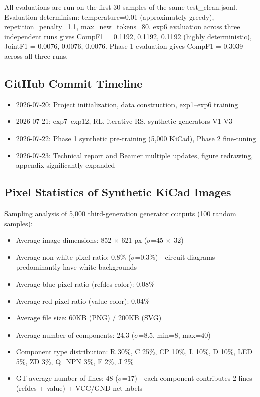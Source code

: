 All evaluations are run on the first 30 samples of the same test\_clean.jsonl. Evaluation determinism: temperature=0.01 (approximately greedy), repetition\_penalty=1.1, max\_new\_tokens=80. exp6 evaluation across three independent runs gives CompF1 = 0.1192, 0.1192, 0.1192 (highly deterministic), JointF1 = 0.0076, 0.0076, 0.0076. Phase 1 evaluation gives CompF1 = 0.3039 across all three runs.

\subsection{GitHub Commit Timeline}

\begin{itemize}[nosep]
    \item 2026-07-20: Project initialization, data construction, exp1--exp6 training
    \item 2026-07-21: exp7--exp12, RL, iterative RS, synthetic generators V1-V3
    \item 2026-07-22: Phase 1 synthetic pre-training (5,000 KiCad), Phase 2 fine-tuning
    \item 2026-07-23: Technical report and Beamer multiple updates, figure redrawing, appendix significantly expanded
\end{itemize}

\subsection{Pixel Statistics of Synthetic KiCad Images}

Sampling analysis of 5,000 third-generation generator outputs (100 random samples):

\begin{itemize}[nosep]
    \item Average image dimensions: 852 $\times$ 621 px ($\sigma$=45 $\times$ 32)
    \item Average non-white pixel ratio: 0.8\% ($\sigma$=0.3\%)---circuit diagrams predominantly have white backgrounds
    \item Average blue pixel ratio (refdes color): 0.08\%
    \item Average red pixel ratio (value color): 0.04\%
    \item Average file size: 60KB (PNG) / 200KB (SVG)
    \item Average number of components: 24.3 ($\sigma$=8.5, min=8, max=40)
    \item Component type distribution: R 30\%, C 25\%, CP 10\%, L 10\%, D 10\%, LED 5\%, ZD 3\%, Q\_NPN 3\%, F 2\%, J 2\%
    \item GT average number of lines: 48 ($\sigma$=17)---each component contributes 2 lines (refdes + value) + VCC/GND net labels
\end{itemize}

